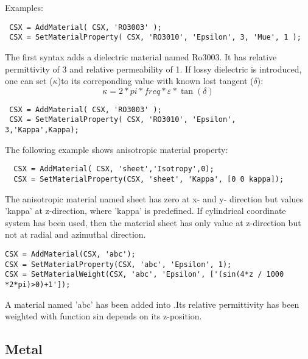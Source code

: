 \begin{FontDescr}{Examples:}

\begin{lstlisting}
 CSX = AddMaterial( CSX, 'RO3003' );
 CSX = SetMaterialProperty( CSX, 'RO3010', 'Epsilon', 3, 'Mue', 1 );
\end{lstlisting}
 
 The first syntax adds a dielectric material named Ro3003. It has relative permittivity of 3 and relative permeability of 1. If lossy dielectric is introduced, one can set 
($\kappa$)to its correponding value with known lost tangent ($\delta$): \begin{equation}
\kappa=2*pi*freq*\varepsilon*\tan(\delta)
\end{equation} 
\begin{lstlisting}
 CSX = AddMaterial( CSX, 'RO3003' );
 CSX = SetMaterialProperty( CSX, 'RO3010', 'Epsilon', 3,'Kappa',Kappa);
\end{lstlisting}

The following example shows anisotropic material property: 

\begin{lstlisting} 
  CSX = AddMaterial( CSX, 'sheet','Isotropy',0);
  CSX = SetMaterialProperty(CSX, 'sheet', 'Kappa', [0 0 kappa]);
\end{lstlisting}

The anisotropic material named sheet has zero  at x- and y- direction but values 'kappa' at z-direction, where 'kappa' is predefined. If cylindrical coordinate system has been used, then the material sheet has only value at z-direction but not at radial and azimuthal direction. 
    
\begin{lstlisting} 
CSX = AddMaterial(CSX, 'abc');
CSX = SetMaterialProperty(CSX, 'abc', 'Epsilon', 1);
CSX = SetMaterialWeight(CSX, 'abc', 'Epsilon', ['(sin(4*z / 1000 *2*pi)>0)+1']);
\end{lstlisting}

A material named 'abc' has been added into \hyperref[CSX]{}.Its relative permittivity has been weighted with function sin depends on its z-position. 

\end{FontDescr}


\subsection{Metal}\label{subsection_metal}
 
 
